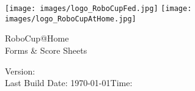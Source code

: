 \documentclass[11pt, a4paper]{book}
\begin{document}
\begin{titlepage}
  \begin{center}
    {
      \texttt{[image: images/logo\_RoboCupFed.jpg]}
      \hfill
      \texttt{[image: images/logo\_RoboCupAtHome.jpg]}\\[1.23ex]
    }
    \vspace{2.7 cm}
    \hrulefill\par
    {%
      \vspace*{.27cm}
      \Huge{RoboCup@Home}\\[1.23ex]
      \Large Forms \& Score Sheets\\[2ex]
    }
    \hrulefill\par
    \vfill
    Version: \YEAR{} \quad \svnRevision{}\\
    Last Build Date: \today \quad Time: \the\time{}\\
    \svnChangeData{}%
  \end{center}
\end{titlepage}

\pagestyle{plain}



\renewcommand{\shortScoresheet}{false}


\renewcommand{\currentTest}{Poster Session}
\begin{scoresheet}

\end{scoresheet}



\renewcommand{\currentTest}{Help Me Carry}
\begin{scoresheet}

\end{scoresheet}

\renewcommand{\currentTest}{General Purpose Service Robot}
\begin{scoresheet}

\end{scoresheet}

\renewcommand{\currentTest}{Receptionist}
\begin{scoresheet}

\end{scoresheet}

\renewcommand{\currentTest}{Storing Groceries}
\begin{scoresheet}

\end{scoresheet}
\end{document}
